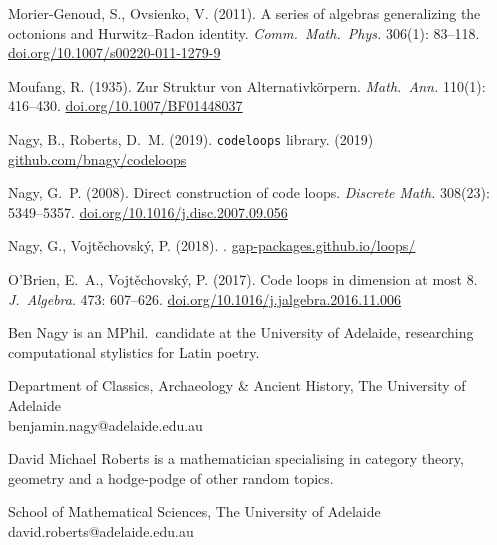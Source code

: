 \documentclass{article}
\theoremstyle{plain}
\theoremstyle{definition}
\begin{document}
\begin{thebibliography}{10}
Morier-Genoud, S., Ovsienko, V. (2011).
\newblock A series of algebras generalizing the octonions and Hurwitz--Radon
  identity.
\newblock \emph{Comm.\ Math.\ Phys.} 306(1): 83--118.
\newblock \url{doi.org/10.1007/s00220-011-1279-9}

Moufang, R. (1935).
\newblock Zur {S}truktur von {A}lternativk\"{o}rpern.
\newblock \emph{Math.\ Ann.} 110(1): 416--430.
\newblock \url{doi.org/10.1007/BF01448037}

 Nagy, B., Roberts, D.~M. (2019).
\newblock \texttt{codeloops} library.
\newblock (2019) \url{github.com/bnagy/codeloops} 

Nagy, G.~P. (2008).
\newblock Direct construction of code loops.
\newblock \emph{Discrete Math.} 308(23): 5349--5357.
\newblock \url{doi.org/10.1016/j.disc.2007.09.056}

Nagy, G., Vojt\v{e}chovsk\'{y}, P. (2018).
.
\newblock \url{gap-packages.github.io/loops/}

O'Brien, E.~A., Vojt\v{e}chovsk\'{y}, P. (2017).
\newblock Code loops in dimension at most 8.
\newblock \emph{J.\ Algebra}. 473: 607--626.
\newblock \url{doi.org/10.1016/j.jalgebra.2016.11.006}



\end{thebibliography}



\begin{biog}
\item[Ben Nagy] is an MPhil.\ candidate at the University of Adelaide, researching computational stylistics for Latin poetry.
\begin{affil}
Department of Classics, Archaeology \& Ancient History, The University of Adelaide\\
benjamin.nagy@adelaide.edu.au
\end{affil}

\item[David Michael Roberts] is a mathematician specialising in category theory, geometry and a hodge-podge of other random topics.
\begin{affil}
School of Mathematical Sciences, The University of Adelaide\\
david.roberts@adelaide.edu.au
\end{affil}
\end{biog}
\vfill\eject
\end{document}
